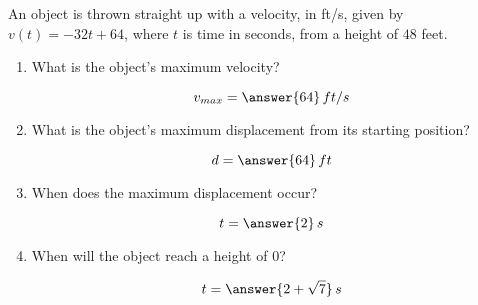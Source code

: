 \documentclass{ximera}
\author{Gregory Hartman \and Matthew Carr}
\begin{document}
\begin{exercise}

An object is thrown straight up with a velocity, in ft/s, given by
$v(t)=-32t+64$, where $t$ is time in seconds, from a height of $48$
feet.
\begin{enumerate}
\item What is the object's maximum velocity? \begin{prompt}\[v_{max}=\answer{64}\,ft/s\]\end{prompt}
\item What is the object's maximum displacement from its starting position? \begin{prompt}\[d=\answer{64}\,ft\]\end{prompt}
\item When does the maximum displacement occur? \begin{prompt}\[t=\answer{2}\,s\]\end{prompt}
\item When will the object reach a height of $0$? \begin{prompt}\[t=\answer{2+\sqrt{7}}\,s\]\end{prompt}
\end{enumerate}

\end{exercise}
\end{document}
